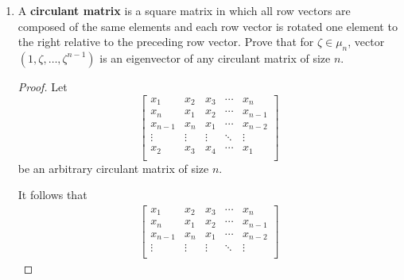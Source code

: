 \documentclass[../psets.tex]{subfiles}
\begin{document}
\begin{enumerate}
\begin{enumerate}
\begin{proof}
\begin{equation*}
\begin{bmatrix}
                \end{bmatrix}
            \end{equation*}
            Thus, we have found four distinct eigenvectors for a $4\times 4$ matrix. Therefore, we have found all of the eigenvalues. Their product equals the determinant, and is also a factorization of the determinant. In particular, the factorized group determinant for $K_4$ is
            \begin{equation*}
                \boxed{(a+b+c+d)(a+b-c-d)(a-b+c-d)(a-b-c+d)}
            \end{equation*}
        \end{proof}
        \item A \textbf{circulant matrix} is a square matrix in which all row vectors are composed of the same elements and each row vector is rotated one element to the right relative to the preceding row vector. Prove that for $\zeta\in\mu_n$, vector $(1,\zeta,\dots,\zeta^{n-1})$ is an eigenvector of any circulant matrix of size $n$.
        \begin{proof}
            Let
            \begin{equation*}
                \begin{bmatrix}
                    x_1     & x_2    & x_3    & \cdots & x_n    \\
                    x_n     & x_1    & x_2    & \cdots & x_{n-1}\\
                    x_{n-1} & x_n    & x_1    & \cdots & x_{n-2}\\
                    \vdots  & \vdots & \vdots & \ddots & \vdots \\
                    x_2     & x_3    & x_4    & \cdots & x_1    \\
                \end{bmatrix}
            \end{equation*}
            be an arbitrary circulant matrix of size $n$.\par
            \pagebreak
            It follows that
            \begin{align*}
                \begin{bmatrix}
                    x_1     & x_2    & x_3    & \cdots & x_n    \\
                    x_n     & x_1    & x_2    & \cdots & x_{n-1}\\
                    x_{n-1} & x_n    & x_1    & \cdots & x_{n-2}\\
                    \vdots  & \vdots & \vdots & \ddots & \vdots \\

\end{bmatrix}
\end{align*}
\end{proof}
\end{enumerate}
\end{enumerate}
\end{document}
